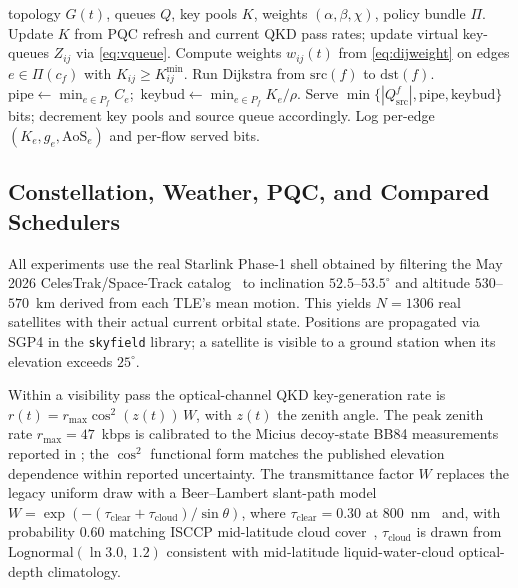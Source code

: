 \documentclass[conference]{IEEEtran}
\begin{document}
\begin{algorithm}[t]
\caption{AoS-aware routing cycle: per-flow Dijkstra approximation
of the ideal scheduler in Theorem~\ref{thm:stab}.}
\label{alg:aos}
\small
\begin{algorithmic}[1]
\REQUIRE topology $G(t)$, queues $Q$, key pools $K$, weights
$(\alpha,\beta,\chi)$, policy bundle $\Pi$.
\STATE Update $K$ from PQC refresh and current QKD pass rates;
       update virtual key-queues $Z_{ij}$ via \eqref{eq:vqueue}.
   \STATE Compute weights $w_{ij}(t)$ from \eqref{eq:dijweight} on
          edges $e\!\in\!\Pi(c_f)$ with $K_{ij}\!\ge\!K_{ij}^{\min}$.
   \STATE Run Dijkstra from $\mathrm{src}(f)$ to $\mathrm{dst}(f)$.
      \STATE $\mathrm{pipe}\!\gets\!\min_{e\in P_f}\!C_e$;\
             $\mathrm{keybud}\!\gets\!\min_{e\in P_f}\!K_e/\rho$.
      \STATE Serve $\min\{|Q^f_{\mathrm{src}}|,\mathrm{pipe},\mathrm{keybud}\}$
             bits; decrement key pools and source queue accordingly.
   \ENDIF
\ENDFOR
\STATE Log per-edge $(K_e,g_e,\mathrm{AoS}_e)$ and per-flow served
       bits.
\end{algorithmic}
\end{algorithm}

\subsection{Constellation, Weather, PQC, and Compared Schedulers}
\label{sec:impl-pqc}

All experiments use the real Starlink Phase-1 shell obtained by
filtering the May 2026 CelesTrak/Space-Track
catalog~\cite{celestrak_gp} to inclination $52.5$--$53.5^\circ$ and
altitude $530$--$570$~km derived from each TLE's mean motion.  This
yields $N=1306$ real satellites with their actual current orbital
state.  Positions are propagated via SGP4 in the \texttt{skyfield}
library; a satellite is visible to a ground station when its
elevation exceeds $25^\circ$.

Within a visibility pass the optical-channel QKD key-generation rate
is $r(t)=r_{\max}\cos^2(z(t))\,W$, with $z(t)$ the zenith angle.
The peak zenith rate $r_{\max}=47$~kbps is calibrated to the
Micius decoy-state BB84 measurements reported in
\cite[Table~1]{liao_satellite_qkd_2017}; the $\cos^2$ functional
form matches the published elevation dependence within reported
uncertainty.  The transmittance factor $W$ replaces the legacy
uniform draw with a Beer--Lambert slant-path model
\(W=\exp(-(\tau_\text{clear}+\tau_\text{cloud})/\sin\theta)\), where
$\tau_\text{clear}=0.30$ at 800~nm~\cite{itu_r_p1814} and, with
probability $0.60$ matching ISCCP mid-latitude cloud
cover~\cite{rossow_schiffer_1999}, $\tau_\text{cloud}$ is drawn from
$\mathrm{Lognormal}(\ln 3.0,\,1.2)$ consistent with mid-latitude
liquid-water-cloud optical-depth climatology.
\end{document}
